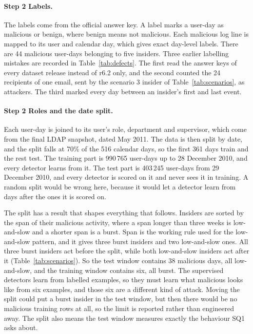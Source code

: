 \documentclass[a4paper,12pt]{article}
\begin{document}
\paragraph{Step 2 Labels.} The labels come from the official answer key. A label marks a user-day as malicious or benign, where benign means not malicious. Each malicious log line is mapped to its user and calendar day, which gives exact day-level labels. There are 44 malicious user-days belonging to five insiders. Three earlier labelling mistakes are recorded in Table~\ref{tab:defects}. The first read the answer keys of every dataset release instead of r6.2 only, and the second counted the 24 recipients of one email, sent by the scenario 3 insider of Table~\ref{tab:scenarios}, as attackers. The third marked every day between an insider's first and last event.

\paragraph{Step 2 Roles and the date split.} Each user-day is joined to its user's role, department and supervisor, which come from the final LDAP snapshot, dated May 2011. The data is then split by date, and the split falls at 70\% of the 516 calendar days, so the first 361 days train and the rest test. The training part is 990\,765 user-days up to 28 December 2010, and every detector learns from it. The test part is 403\,245 user-days from 29 December 2010, and every detector is scored on it and never sees it in training. A random split would be wrong here, because it would let a detector learn from days after the ones it is scored on.

The split has a result that shapes everything that follows. Insiders are sorted by the span of their malicious activity, where a span longer than three weeks is low-and-slow and a shorter span is a burst. Span is the working rule used for the low-and-slow pattern, and it gives three burst insiders and two low-and-slow ones. All three burst insiders act before the split, while both low-and-slow insiders act after it (Table~\ref{tab:scenarios}). So the test window contains 38 malicious days, all low-and-slow, and the training window contains six, all burst. The supervised detectors learn from labelled examples, so they must learn what malicious looks like from six examples, and those six are a different kind of attack. Moving the split could put a burst insider in the test window, but then there would be no malicious training rows at all, so the limit is reported rather than engineered away. The split also means the test window measures exactly the behaviour SQ1 asks about.
\end{document}
